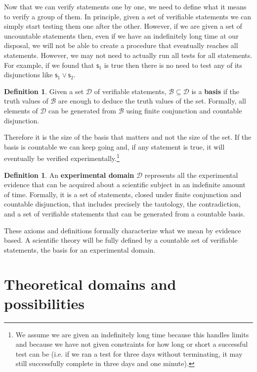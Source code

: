 \documentclass[%
reprint,
amsmath,amssymb,
aps,
prx,
]{revtex4-1}
\theoremstyle{plain}%
\theoremstyle{definition}
\newtheorem{defn}[thrm]{Definition}
\theoremstyle{remark}
\def\OR{\vee}
\newcommand{\stmt}[1][s] {\mathsf{#1}}
\newcommand{\edomain}[1][D] {\mathcal{#1}}
\newcommand{\basis}[1][B] {\mathcal{#1}} %
\begin{document}
Now that we can verify statements one by one, we need to define what it means to verify a group of them. In principle, given a set of verifiable statements we can simply start testing them one after the other. However, if we are given a set of uncountable statements then, even if we have an indefinitely long time at our disposal, we will not be able to create a procedure that eventually reaches all statements. However, we may not need to actually run all tests for all statements. For example, if we found that $\stmt_1$ is true then there is no need to test any of its disjunctions like $\stmt_1 \OR \stmt_2$.

\begin{defn}
	Given a set $\edomain$ of verifiable statements, $\basis \subseteq \edomain$ is a \textbf{basis} if the truth values of $\basis$ are enough to deduce the truth values of the set. Formally, all elements of $\edomain$ can be generated from $\basis$ using finite conjunction and countable disjunction.
\end{defn}

Therefore it is the size of the basis that matters and not the size of the set. If the basis is countable we can keep going and, if any statement is true, it will eventually be verified experimentally.\footnote{We assume we are given an indefinitely long time because this handles limits and because we have not given constraints for how long or short a successful test can be (i.e. if we ran a test for three days without terminating, it may still successfully complete in three days and one minute).}

\begin{defn}
	An \textbf{experimental domain} $\edomain$ represents all the experimental evidence that can be acquired about a scientific subject in an indefinite amount of time. Formally, it is a set of statements, closed under finite conjunction and countable disjunction, that includes precisely the tautology, the contradiction, and a set of verifiable statements that can be generated from a countable basis.
\end{defn}

These axioms and definitions formally characterize what we mean by evidence based. A scientific theory will be fully defined by a countable set of verifiable statements, the basis for an experimental domain.

\section{Theoretical domains and possibilities}
\end{document}
